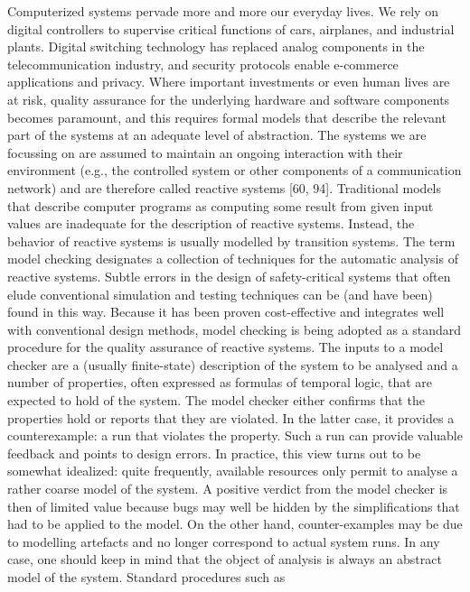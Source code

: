 \documentclass{article}
\begin{document}
	
	Computerized systems pervade more and more our everyday lives. We rely on digital
	controllers to supervise critical functions of cars, airplanes, and industrial plants. Digital
	switching technology has replaced analog components in the telecommunication
	industry, and security protocols enable e-commerce applications and privacy. Where
	important investments or even human lives are at risk, quality assurance for the underlying
	hardware and software components becomes paramount, and this requires formal
	models that describe the relevant part of the systems at an adequate level of abstraction.
	The systems we are focussing on are assumed to maintain an ongoing interaction
	with their environment (e.g., the controlled system or other components of a communication
	network) and are therefore called reactive systems [60, 94]. Traditional models
	that describe computer programs as computing some result from given input values
	are inadequate for the description of reactive systems. Instead, the behavior of reactive
	systems is usually modelled by transition systems.
	The term model checking designates a collection of techniques for the automatic
	analysis of reactive systems. Subtle errors in the design of safety-critical systems that
	often elude conventional simulation and testing techniques can be (and have been)
	found in this way. Because it has been proven cost-effective and integrates well with
	conventional design methods, model checking is being adopted as a standard procedure
	for the quality assurance of reactive systems.
	The inputs to a model checker are a (usually finite-state) description of the system to
	be analysed and a number of properties, often expressed as formulas of temporal logic,
	that are expected to hold of the system. The model checker either confirms that the
	properties hold or reports that they are violated. In the latter case, it provides a counterexample:
	a run that violates the property. Such a run can provide valuable feedback
	and points to design errors. In practice, this view turns out to be somewhat idealized:
	quite frequently, available resources only permit to analyse a rather coarse model of
	the system. A positive verdict from the model checker is then of limited value because
	bugs may well be hidden by the simplifications that had to be applied to the model.
	On the other hand, counter-examples may be due to modelling artefacts and no longer
	correspond to actual system runs. In any case, one should keep in mind that the object
	of analysis is always an abstract model of the system. Standard procedures such as
\end{document}
